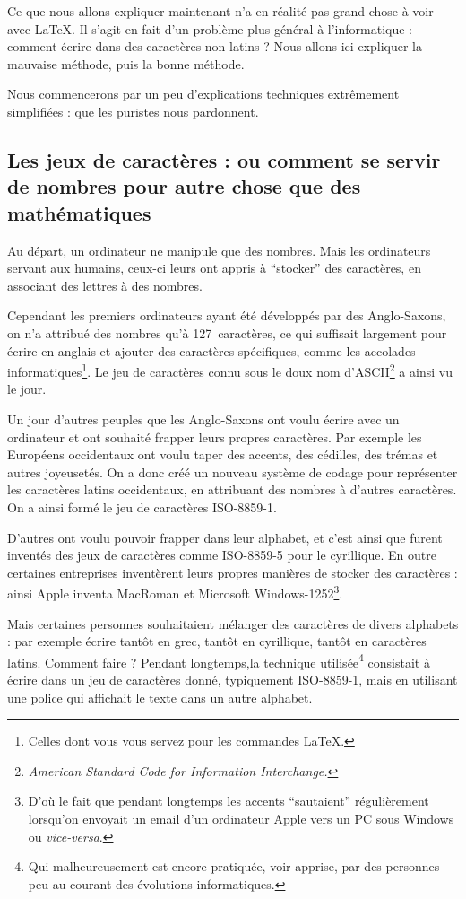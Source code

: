 Ce que nous allons expliquer maintenant n'a en réalité pas grand chose à voir avec \LaTeX. Il s'agit en fait d'un problème plus général à l'informatique : comment écrire dans des caractères non latins ? Nous allons ici expliquer la mauvaise méthode, puis la bonne méthode.

Nous commencerons par un peu d'explications techniques extrêmement simplifiées : que les puristes nous pardonnent.

\subsection{Les jeux de caractères : ou comment se servir de nombres pour autre chose que des mathématiques}

Au départ, un ordinateur ne manipule que des nombres. Mais les ordinateurs servant aux humains, ceux-ci leurs ont appris à \enquote{stocker} des caractères, en associant des lettres à des nombres.

Cependant les premiers ordinateurs ayant été développés par des Anglo-Saxons, on n'a  attribué des nombres qu'à  127~caractères, ce qui suffisait largement pour écrire en anglais et ajouter des caractères spécifiques, comme les accolades informatiques\footnote{Celles dont vous vous servez pour les commandes \LaTeX.}.  Le jeu de caractères connu sous le doux nom d'ASCII\footnote{\emph{\textenglish{American Standard Code for Information Interchange.}}} a ainsi vu le jour.

Un jour d'autres peuples que les Anglo-Saxons ont voulu écrire avec un ordinateur et ont souhaité frapper leurs propres caractères. Par exemple les Européens occidentaux ont voulu taper des accents, des cédilles, des trémas et autres joyeusetés. On a donc créé un nouveau système de codage pour représenter les caractères latins occidentaux, en attribuant des nombres à d'autres caractères. On a ainsi formé le jeu de caractères  ISO-8859-1. 

D'autres ont voulu pouvoir frapper dans leur alphabet, et c'est ainsi que furent inventés des jeux de caractères comme ISO-8859-5 pour le cyrillique. En outre certaines entreprises inventèrent leurs propres manières de stocker des caractères :  ainsi Apple inventa MacRoman et Microsoft Windows-1252\footnote{D'où le fait que pendant longtemps les accents \enquote{sautaient} régulièrement lorsqu'on envoyait un email d'un ordinateur Apple vers un PC sous Windows ou \emph{vice-versa}.}. 

Mais certaines personnes souhaitaient mélanger des caractères de divers alphabets : par exemple écrire tantôt en grec, tantôt en cyrillique, tantôt en caractères latins. Comment faire ? Pendant longtemps,la technique utilisée\footnote{Qui malheureusement est encore pratiquée, voir apprise, par des personnes peu au courant des évolutions informatiques.} consistait à écrire dans un jeu de caractères donné, typiquement ISO-8859-1, mais en utilisant une police qui affichait le texte dans un autre alphabet. 

